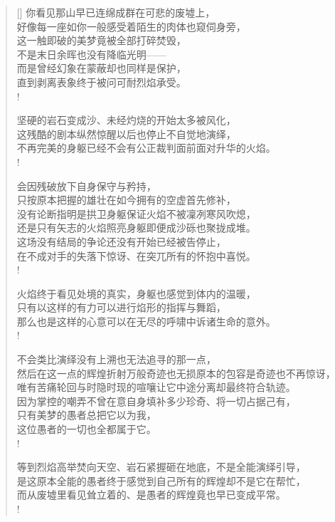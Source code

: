 \documentclass[UTF8, 12pt, a4paper]{ctexrep} %
\begin{document}
\begin{verse}[\versewidth]
你看见那山早已连绵成群在可悲的废墟上，\\
好像每一座如你一般感受着陌生的肉体也窥伺身旁，\\
这一触即破的美梦竟被全部打碎焚毁，\\
不是末日余晖也没有降临光明——\\
而是曾经幻象在蒙蔽却也同样是保护，\\
直到剥离表象终于被问可耐烈焰承受。\\!

坚硬的岩石变成沙、未经灼烧的开始太多被风化，\\
这残酷的剧本纵然惊醒以后也停止不自觉地演绎，\\
不再完美的身躯已经不会有公正裁判面前面对升华的火焰。\\!

会因残破放下自身保守与矜持，\\
只按原本把握的雄壮在如今拥有的空虚首先修补，\\
没有论断指明是拱卫身躯保证火焰不被凜冽寒风吹熄，\\
还是只有矢志的火焰照亮身躯即便成沙砾也聚拢成堆。\\
这场没有结局的争论还没有开始已经被告停止，\\
在不成对手的失落下惊讶、在突兀所有的怀抱中喜悦。\\!

火焰终于看见处境的真实，身躯也感觉到体内的温暖，\\
只有以这样的有力可以进行焰形的指挥与舞蹈，\\
那么也是这样的心意可以在无尽的呼啸中诉诸生命的意外。\\!

不会类比演绎没有上溯也无法追寻的那一点，\\
然后在这一点的辉煌折射万般奇迹也无损原本的包容是奇迹也不再惊讶，\\
唯有苦痛轮回与时隐时现的喧嚷让它中途分离却最终符合轨迹。\\
因为掌控的嘲弄不曾在意自身填补多少珍奇、将一切占据己有，\\
只有美梦的愚者总把它以为我，\\
这位愚者的一切也全都属于它。\\!

等到烈焰高举焚向天空、岩石紧握砸在地底，不是全能演绎引导，\\
是这原本全能的愚者终于感觉到自己所有的辉煌却不是它在帮忙，\\
而从废墟里看见耸立着的、是愚者的辉煌竟也早已变成平常。\\!


\end{verse}
\end{document}
